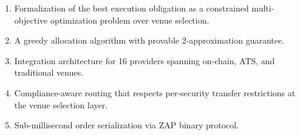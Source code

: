 \begin{enumerate}[nosep]
  \item Formalization of the best execution obligation as a constrained multi-objective optimization problem over venue selection.
  \item A greedy allocation algorithm with provable 2-approximation guarantee.
  \item Integration architecture for 16 providers spanning on-chain, ATS, and traditional venues.
  \item Compliance-aware routing that respects per-security transfer restrictions at the venue selection layer.
  \item Sub-millisecond order serialization via ZAP binary protocol.
\end{enumerate}

